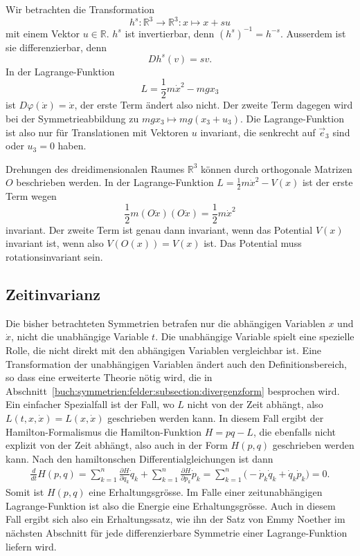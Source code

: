 \begin{beispiel}
\label{buch:symmetrien:symmetrie:beispiel:homogen}
Wir betrachten die Transformation
\[
h^s
\colon
\mathbb{R}^3 \to \mathbb{R}^3
:
x \mapsto x + su
\]
mit einem Vektor $u\in\mathbb{R}$.
$h^s$ ist invertierbar, denn $(h^s)^{-1}=h^{-s}$.
Ausserdem ist sie differenzierbar, denn
\[
Dh^s(v)
=
sv.
\]
In der Lagrange-Funktion
\[
L
=
\frac12m\dot{x}^2 - mgx_3
\]
ist $D\varphi(\dot{x})=\dot{x}$, der erste Term ändert also nicht.
Der zweite Term dagegen wird bei der Symmetrieabbildung zu
$mgx_3\mapsto mg(x_3+u_3)$.
Die Lagrange-Funktion ist also nur für Translationen mit Vektoren $u$
invariant, die senkrecht auf $\vec{e}_3$ sind oder $u_3=0$ haben.
\end{beispiel}

\begin{beispiel}
\label{buch:symmetrien:symmetrie:beispiel:drehung}
Drehungen des dreidimensionalen Raumes $\mathbb{R}^3$ können durch
orthogonale Matrizen $O$ beschrieben werden.
In der Lagrange-Funktion $L=\frac12m\dot{x}^2-V(x)$ ist der erste
Term wegen
\[
\frac12m (O\dot{x})(O\dot{x})
=
\frac12m\dot{x}^2
\]
invariant.
Der zweite Term ist genau dann invariant, wenn das Potential $V(x)$
invariant ist, wenn also $V(O(x))=V(x)$ ist.
Das Potential muss rotationsinvariant sein.
\end{beispiel}

%
%
\subsection{Zeitinvarianz}
%
Die bisher betrachteten Symmetrien betrafen nur die abhängigen
Variablen $x$ und $\dot{x}$, nicht die unabhängige Variable $t$.
Die unabhängige Variable spielt eine spezielle Rolle, die nicht
direkt mit den abhängigen Variablen vergleichbar ist.
Eine Transformation der unabhängigen Variablen ändert auch den
Definitionsbereich, so dass eine erweiterte Theorie nötig wird, 
die in Abschnitt~\ref{buch:symmetrien:felder:subsection:divergenzform}
besprochen wird.
Ein einfacher Spezialfall ist der Fall, wo $L$ nicht von der
Zeit abhängt, also $L(t,x,\dot{x})=L(x,\dot{x})$ geschrieben werden
kann.
In diesem Fall ergibt der Hamilton-Formalismus die Hamilton-Funktion
$H=pq-L$, die ebenfalls nicht explizit von der Zeit abhängt, also
auch in der Form $H(p,q)$ geschrieben werden kann.
Nach den hamiltonschen Differentialgleichungen ist dann
\begin{align*}
\frac{d}{dt}H(p,q)
=
\sum_{k=1}^n
\frac{\partial H}{\partial q_k}\dot{q}_k
+
\sum_{k=1}^n
\frac{\partial H}{\partial p_k}\dot{p}_k
=
\sum_{k=1}^n
\bigl(
-
\dot{p}_k\dot{q}_k
+
\dot{q}_k\dot{p}_k
\bigr)
=
0.
\end{align*}
Somit ist $H(p,q)$ eine Erhaltungsgrösse.
Im Falle einer zeitunabhängigen Lagrange-Funk\-tion ist also die
Energie eine Erhaltungsgrösse.
%
Auch in diesem Fall ergibt sich also ein Erhaltungssatz, wie ihn
der Satz von Emmy Noether im nächsten Abschnitt für jede differenzierbare
Symmetrie einer Lagrange-Funktion liefern wird.

